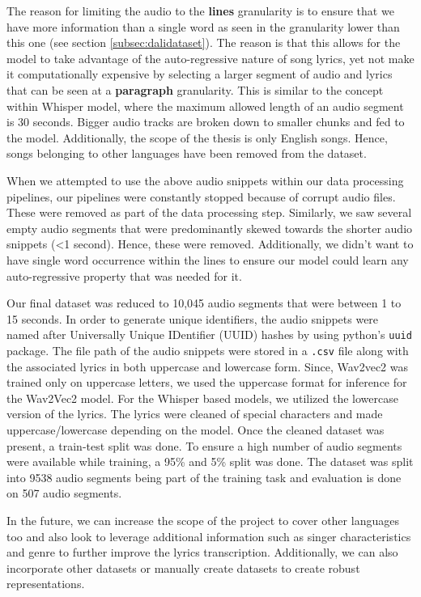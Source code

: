 The reason for limiting the audio to the \textbf{lines} granularity is to ensure that we have more information than a single word as seen in the granularity lower than this one (see section \ref{subsec:dalidataset}). The reason is that this allows for the model to take advantage of the auto-regressive nature of song lyrics, yet not make it computationally expensive by selecting a larger segment of audio and lyrics that can be seen at a \textbf{paragraph} granularity. This is similar to the concept within Whisper model, where the maximum allowed length of an audio segment is 30 seconds. Bigger audio tracks are broken down to smaller chunks and fed to the model. Additionally, the scope of the thesis is only English songs. Hence, songs belonging to other languages have been removed from the dataset.

When we attempted to use the above audio snippets within our data processing pipelines, our pipelines were constantly stopped because of corrupt audio files. These were removed as part of the data processing step. Similarly, we saw several empty audio segments that were predominantly skewed towards the shorter audio snippets (<1 second). Hence, these were removed. Additionally, we didn't want to have single word occurrence within the lines to ensure our model could learn any auto-regressive property that was needed for it.

Our final dataset was reduced to 10,045 audio segments that were between 1 to 15 seconds. In order to generate unique identifiers, the audio snippets were named after Universally Unique IDentifier (UUID) hashes by using python's \texttt{uuid} package. The file path of the audio snippets were stored in a \texttt{.csv} file along with the associated lyrics in both uppercase and lowercase form. Since, Wav2vec2 was trained only on uppercase letters, we used the uppercase format for inference for the Wav2Vec2 model. For the Whisper based models, we utilized the lowercase version of the lyrics. The lyrics were cleaned of special characters and made uppercase/lowercase depending on the model. Once the cleaned dataset was present, a train-test split was done. To ensure a high number of audio segments were available while training, a 95\% and 5\% split was done.  The dataset was split into 9538 audio segments being part of the training task and evaluation is done on 507 audio segments.

In the future, we can increase the scope of the project to cover other languages too and also look to leverage additional information such as singer characteristics and genre to further improve the lyrics transcription. Additionally, we can also incorporate other datasets or manually create datasets to create robust representations.



